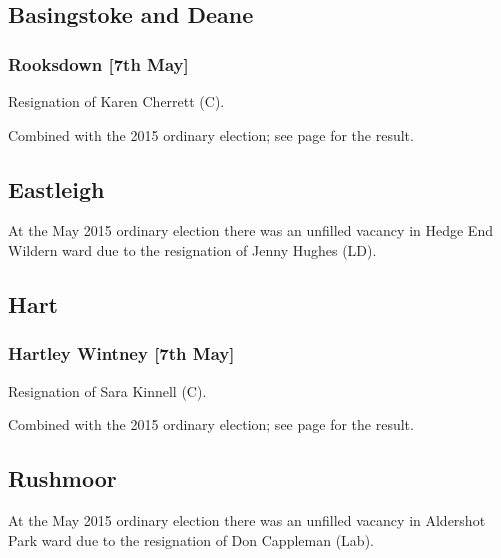 \documentclass[a4paper,openany]{book}
\begin{document}
\begin{resultsiii}
\subsection*{Basingstoke and Deane}

\subsubsection*{Rooksdown \hspace*{\fill}\nolinebreak[1]%
\enspace\hspace*{\fill}
[7th May]}


Resignation of Karen Cherrett (C).

Combined with the 2015 ordinary election; see page \pageref{RooksdownBasingstokeDeane} for the result.

\subsection*{Eastleigh}

At the May 2015 ordinary election there was an unfilled vacancy in Hedge End Wildern ward due to the resignation of Jenny Hughes (LD).

\subsection*{Hart}

\subsubsection*{Hartley Wintney \hspace*{\fill}\nolinebreak[1]%
\enspace\hspace*{\fill}
[7th May]}


Resignation of Sara Kinnell (C).

Combined with the 2015 ordinary election; see page \pageref{HartleyWintneyHart} for the result.

\subsection*{Rushmoor}

At the May 2015 ordinary election there was an unfilled vacancy in Aldershot Park ward due to the resignation of Don Cappleman (Lab).


\end{resultsiii}
\end{document}
